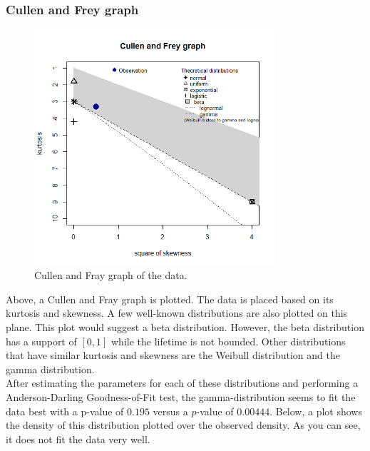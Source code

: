 \subsubsection{Cullen and Frey graph}
\begin{figure}[H]
\centering
\includegraphics[width=0.8\textwidth]{Plots/CullenAndFray.png}
\caption{Cullen and Fray graph of the data.}
\end{figure}
Above, a Cullen and Fray graph is plotted. The data is placed based on its kurtosis and skewness. A few well-known distributions are also plotted on this plane. This plot would suggest a beta distribution. However, the beta distribution has a support of $[0,1]$ while the lifetime is not bounded. Other distributions that have similar kurtosis and skewness are the Weibull distribution and the gamma distribution.\\
After estimating the parameters for each of these distributions and performing a Anderson-Darling Goodness-of-Fit test, the gamma-distribution seems to fit the data best with a p-value of $0.195$ versus a $p$-value of $0.00444$. Below, a plot shows the density of this distribution plotted over the observed density. As you can see, it does not fit the data very well.
